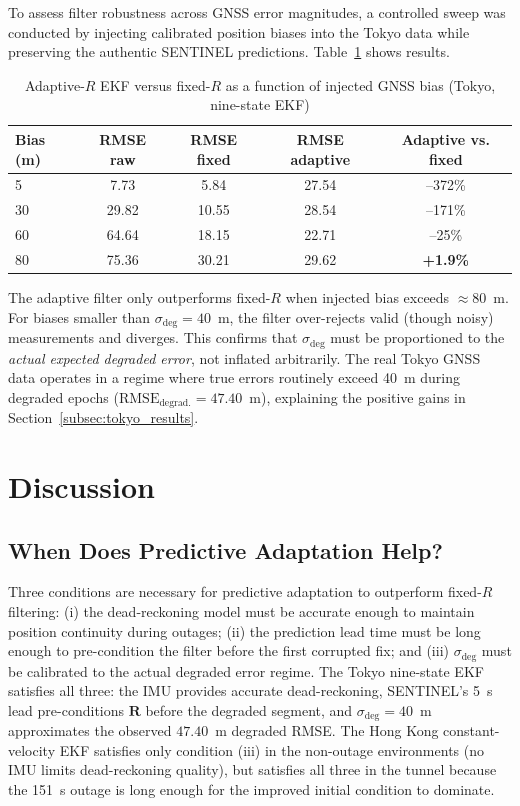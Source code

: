\documentclass[journal]{IEEEtran}
\newcommand{\Rmat}{\mathbf{R}}
\newcommand{\sigdeg}{\sigma_{\mathrm{deg}}}
\begin{document}
To assess filter robustness across GNSS error magnitudes, a controlled
sweep was conducted by injecting calibrated position biases into the Tokyo
data while preserving the authentic SENTINEL predictions.
Table~\ref{tab:severity} shows results.

\begin{table}[h]
\caption{Adaptive-$R$ EKF versus fixed-$R$ as a function of injected
GNSS bias (Tokyo, nine-state EKF)}
\label{tab:severity}
\begin{tabular}{@{}lcccc@{}}
\toprule
Bias (m) & RMSE raw & RMSE fixed & RMSE adaptive & Adaptive vs. fixed \\
\midrule
  5 &  7.73 &  5.84 & 27.54 & --372\% \\
 30 & 29.82 & 10.55 & 28.54 & --171\% \\
 60 & 64.64 & 18.15 & 22.71 &  --25\% \\
 80 & 75.36 & 30.21 & 29.62 & \textbf{+1.9\%} \\
\bottomrule
\end{tabular}
\end{table}

The adaptive filter only outperforms fixed-$R$ when injected bias exceeds
${\approx}$80~m.  For biases smaller than $\sigdeg = 40$~m, the filter
over-rejects valid (though noisy) measurements and diverges.  This confirms
that $\sigdeg$ must be proportioned to the \emph{actual expected degraded
error}, not inflated arbitrarily.  The real Tokyo GNSS data operates in
a regime where true errors routinely exceed 40~m during degraded epochs
($\text{RMSE}_\text{degrad.} = 47.40$~m), explaining the positive gains in
Section~\ref{subsec:tokyo_results}.

\section{Discussion}

\subsection{When Does Predictive Adaptation Help?}

Three conditions are necessary for predictive adaptation to outperform
fixed-$R$ filtering: (i) the dead-reckoning model must be accurate enough
to maintain position continuity during outages; (ii) the prediction lead
time must be long enough to pre-condition the filter before the first
corrupted fix; and (iii) $\sigdeg$ must be calibrated to the actual degraded
error regime.  The Tokyo nine-state EKF satisfies all three: the IMU provides
accurate dead-reckoning, SENTINEL's 5~s lead pre-conditions $\Rmat$ before
the degraded segment, and $\sigdeg = 40$~m approximates the observed
$47.40$~m degraded RMSE.  The Hong Kong constant-velocity EKF satisfies only
condition (iii) in the non-outage environments (no IMU limits dead-reckoning
quality), but satisfies all three in the tunnel because the 151~s outage is
long enough for the improved initial condition to dominate.
\end{document}
